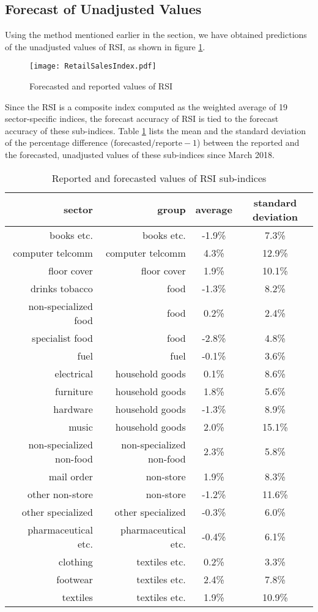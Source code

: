 \documentclass[a4paper,11pt,pdftex,twoside,titlepage]{article}
\begin{document}
\subsection{Forecast of Unadjusted Values}
\label{sec:unadjusted_forecast}
Using the method mentioned earlier in the section, we have obtained
predictions of the unadjusted values of RSI, as shown in figure
\ref{fig:grth67}.
\begin{figure}[htb!]
  \centering
  \texttt{[image: RetailSalesIndex.pdf]}
  \caption{Forecasted and reported values of RSI}
  \label{fig:grth67}
\end{figure}
Since the RSI is a composite index computed as the weighted average of
19 sector-specific indices, the forecast accuracy of RSI is tied to
the forecast accuracy of these sub-indices. Table
\ref{tab:g56y} lists the mean and the standard deviation of
the percentage difference ($\text{forecasted}/\text{reporte} - 1$)
between the reported and the forecasted, unadjusted values of these
sub-indices since March 2018.
\begin{table}[htb!]
  \centering
  \begin{tabular}{r|r|c|c}
    sector & group & average & standard deviation \\
    \hline
    books etc. & books etc. & -1.9\% &  7.3\%\\
    computer telcomm & computer telcomm & 4.3\% &  12.9\%\\
    floor cover & floor cover & 1.9\% &  10.1\%\\
    drinks tobacco & food & -1.3\% &  8.2\%\\
    non-specialized food & food & 0.2\% &  2.4\%\\
    specialist food & food & -2.8\% &  4.8\%\\
    fuel & fuel & -0.1\% &  3.6\%\\
    electrical & household goods & 0.1\% &  8.6\%\\
    furniture & household goods & 1.8\% &  5.6\%\\
    hardware & household goods & -1.3\% &  8.9\%\\
    music & household goods & 2.0\% &  15.1\%\\
    non-specialized non-food & non-specialized non-food & 2.3\% &  5.8\%\\
    mail order & non-store & 1.9\% &  8.3\%\\
    other non-store & non-store & -1.2\% &  11.6\%\\
    other specialized & other specialized & -0.3\% &  6.0\%\\
    pharmaceutical etc. & pharmaceutical etc. & -0.4\% &  6.1\%\\
    clothing & textiles etc. & 0.2\% &  3.3\%\\
    footwear & textiles etc. & 2.4\% &  7.8\%\\
    textiles & textiles etc. & 1.9\% &  10.9\%
  \end{tabular}
  \caption{Reported and forecasted values of RSI sub-indices}
  \label{tab:g56y}
\end{table}
\end{document}
